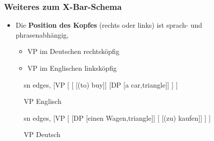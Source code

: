\begin{frame}
\frametitle{Weiteres zum X-Bar-Schema}

	\begin{itemize}
		\item Die \textbf{Position des Kopfes} (rechts oder links) ist sprach- und phrasenabhängig,
		\begin{itemize}
			\item VP im Deutschen \ras rechtsköpfig
			\item VP im Englischen \ras linksköpfig			
		\end{itemize}
	\end{itemize}
	
\begin{figure}[b]
  	\begin{minipage}[b]{0.45\textwidth}
	\centering
	\footnotesize{
		\begin{forest}
		sn edges,
		[VP	[
					[\alert{} [(to) buy]]
					[DP [a car,triangle]]
			]
		]
		\end{forest}
		}
		\caption{VP Englisch}
  	\end{minipage}  
	\begin{minipage}[b]{0.45\textwidth}
	\centering
	\footnotesize{
		\begin{forest}
		sn edges,
		[VP	[\MyPxbar{V}
					[DP [einen Wagen,triangle]]
					[\alert{} [(zu) kaufen]]					
			]
		]
		\end{forest}
		}
		\caption{VP Deutsch}
  	\end{minipage}  
\end{figure}

\end{frame}


